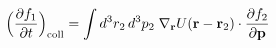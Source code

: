\documentclass[preview]{standalone}
\begin{document}
\begin{align*}
\special{dvisvgm:raw <g id='unique000'>}\Big(\pdv{f_1}{t}\Big)_{\rm coll}=\int d^3r_2\,d^3p_2\;\nabla_{\va r}U(\va r-\va r_2)\cdot\pdv{f_2}{\va p}\special{dvisvgm:raw </g>}
\end{align*}
\end{document}
